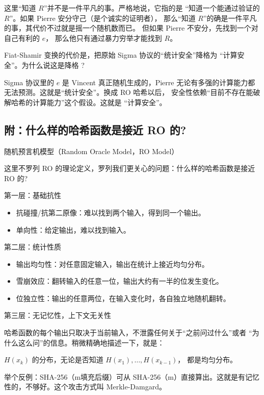 这里“知道 $R$”并不是一件平凡的事。严格地说，它指的是
“知道一个能通过验证的 $R$”。如果 Pierre 安分守己（是个诚实的证明者），
那么“知道 $R$”的确是一件平凡的事，其代价不过就是摇一个随机数而已。
但如果 Pierre 不安分，先找到一个对自己有利的 $e$，
那么他只有通过暴力穷举才能找到 $R$。

Fiat-Shamir 变换的代价是，把原始 Sigma 协议的“统计安全”降格为
“计算安全”。为什么说这是降格 ?

Sigma 协议里的 $e$ 是 Vincent 真正随机生成的，Pierre
无论有多强的计算能力都无法预测。这就是“统计安全”。换成 RO 哈希以后，
安全性依赖“目前不存在能破解哈希的计算能力”这个假设。这就是
“计算安全”。

\subsection{附：什么样的哈希函数是接近 RO 的?}

随机预言机模型（Random Oracle Model，RO Model）

这里不罗列 RO 的理论定义，罗列我们更关心的问题：什么样的哈希函数是接近
RO 的?

第一层：基础抗性

\begin{itemize}

\item
  抗碰撞/抗第二原像：难以找到两个输入，得到同一个输出。
\item
  单向性：给定输出，难以找到输入。
\end{itemize}

第二层：统计性质

\begin{itemize}

\item
  输出均匀性：对任意固定输入，输出在统计上接近均匀分布。
\item
  雪崩效应：翻转输入的任意一位，输出大约有一半的位发生变化。
\item
  位独立性：输出的任意两位，在输入变化时，各自独立地随机翻转。
\end{itemize}

第三层：无记忆性，上下文无关性

哈希函数的每个输出只取决于当前输入，不泄露任何关于“之前问过什么”或者
“为什么这么问”的信息。稍微精确地描述一下，就是：

$H(x_k)$ 的分布，无论是否知道 $H(x_1), \ldots, H(x_{k-1})$，
都是均匀分布。

举个反例：SHA-256（m\textbar\textbar 填充\textbar\textbar 后缀）可从
SHA-256（m）直接算出。这就是有记忆性的，不够好。这个攻击方式叫
Merkle-Damgard。
